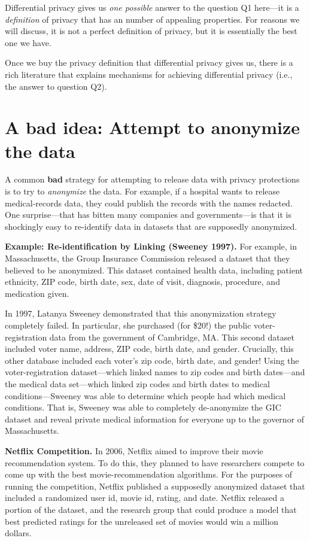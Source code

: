 \documentclass[
  letterpaper,
]{scrbook}
\theoremstyle{definition}
\theoremstyle{plain}
\theoremstyle{plain}
\theoremstyle{remark}
\begin{document}
Differential privacy gives us \emph{one possible} answer to the question
Q1 here---it is a \emph{definition} of privacy that has an number of
appealing properties. For reasons we will discuss, it is not a perfect
definition of privacy, but it is essentially the best one we have.

Once we buy the privacy definition that differential privacy gives us,
there is a rich literature that explains mechanisms for achieving
differential privacy (i.e., the answer to question Q2).

\section{A bad idea: Attempt to anonymize the
data}\label{a-bad-idea-attempt-to-anonymize-the-data}

A common \textbf{bad} strategy for attempting to release data with
privacy protections is to try to \emph{anonymize} the data. For example,
if a hospital wants to release medical-records data, they could publish
the records with the names redacted. One surprise---that has bitten many
companies and governments---is that it is shockingly easy to re-identify
data in datasets that are supposedly anonymized.

\textbf{Example: Re-identification by Linking (Sweeney 1997).} For
example, in Massachusetts, the Group Insurance Commission released a
dataset that they believed to be anonymized. This dataset contained
health data, including patient ethnicity, ZIP code, birth date, sex,
date of visit, diagnosis, procedure, and medication given.

In 1997, Latanya Sweeney demonstrated that this anonymization strategy
completely failed. In particular, she purchased (for \$20!) the public
voter-registration data from the government of Cambridge, MA. This
second dataset included voter name, address, ZIP code, birth date, and
gender. Crucially, this other database included each voter's zip code,
birth date, and gender! Using the voter-registration dataset---which
linked names to zip codes and birth dates---and the medical data
set---which linked zip codes and birth dates to medical
conditions---Sweeney was able to determine which people had which
medical conditions. That is, Sweeney was able to completely de-anonymize
the GIC dataset and reveal private medical information for everyone up
to the governor of Massachusetts.

\textbf{Netflix Competition.} In 2006, Netflix aimed to improve their
movie recommendation system. To do this, they planned to have
researchers compete to come up with the best movie-recommendation
algorithms. For the purposes of running the competition, Netflix
published a supposedly anonymized dataset that included a randomized
user id, movie id, rating, and date. Netflix released a portion of the
dataset, and the research group that could produce a model that best
predicted ratings for the unreleased set of movies would win a million
dollars.
\end{document}
